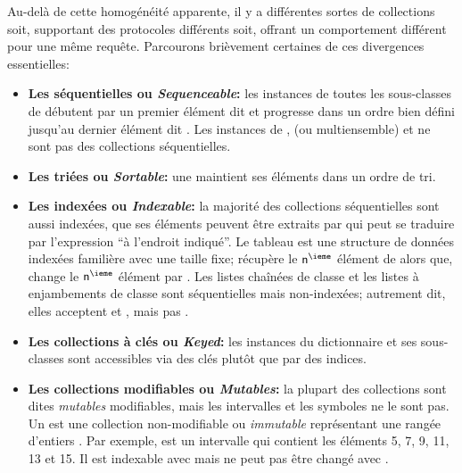 \documentclass[a4paper,10pt,twoside]{book}
\begin{document}
Au-delà de cette homogénéité apparente,
il y a différentes sortes de collections soit, supportant des protocoles 
différents soit, offrant un comportement différent pour une même requête.
Parcourons brièvement certaines de ces divergences essentielles:

\begin{itemize}
  \item {\bf Les séquentielles ou \emph{Sequenceable}:}
  les instances de toutes les sous-classes de  
débutent par un premier élément dit  et progresse dans un ordre bien défini jusqu'au
dernier élément dit .
Les instances de ,  (ou multiensemble) et  ne sont pas des collections séquentielles.

  \item {\bf Les triées ou \emph{Sortable}:}
une  maintient ses éléments dans un ordre de 
tri.

  \item {\bf Les indexées ou \emph{Indexable}:}
la majorité des collections séquentielles sont aussi indexées, \cad
que ses éléments peuvent être extraits par 	
 qui peut se traduire par l'expression ``à l'endroit indiqué''.
	Le tableau  est une structure de données indexées familière avec une taille fixe;   récupère le
 $\mbox{\ct{n}}^{\ieme}$ élément de  alors que, 
 change le $\mbox{\ct{n}}^{\ieme}$ élément 
par .
	Les listes chaînées de classe  et
les listes à enjambements de classe  sont séquentielles mais non-indexées; autrement dit, elles acceptent  et , mais pas .

  \item {\bf Les collections à clés ou \emph{Keyed}:}
	les instances du dictionnaire  et ses sous-classes
sont accessibles via des clés plutôt que par des indices.

  \item {\bf Les collections modifiables ou \emph{Mutables}:}
  	la plupart des collections sont dites \emph{mutables} \cad modifiables, mais les intervalles  et les symboles  ne le sont pas.
	Un  est une collection non-modifiable ou \emph{immutable} représentant une rangée d'entiers .  Par exemple, 
 est un intervalle  qui contient les 
éléments 5, 7, 9, 11, 13 et 15.  Il est indexable avec  mais ne peut pas être changé avec .


\end{itemize}
\end{document}
